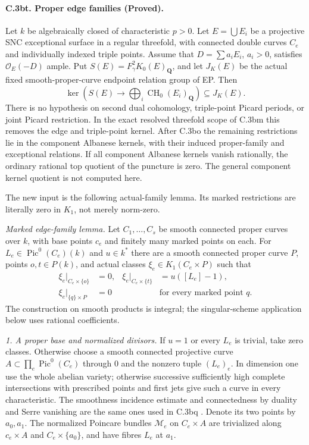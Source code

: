\paragraph{C.3bt. Proper edge families (Proved).}
Let $k$ be algebraically closed of characteristic $p>0$.
Let $E=\bigcup E_i$ be a projective SNC exceptional surface in a
regular threefold, with connected double curves $C_e$ and individually
indexed triple points. Assume that $D=\sum a_iE_i$, $a_i>0$, satisfies
$\mathcal O_E(-D)$ ample. Put $S(E)=F_\gamma^2K_0(E)_{\mathbf Q}$,
and let $J_K(E)$ be the actual fixed smooth-proper-curve endpoint
relation group of EP. Then
\begin{equation}
 \ker\left(S(E)\longrightarrow
       \bigoplus_i\operatorname{CH}_0(E_i)_{\mathbf Q}\right)
                       \subseteq J_K(E).                 \tag{VE.1}
\end{equation}
There is no hypothesis on second dual cohomology, triple-point
Picard periods, or joint Picard restriction. In the exact resolved
threefold scope of C.3bm this removes the edge and triple-point kernel.
After C.3bo the remaining restrictions lie in the component Albanese
kernels, with their induced proper-family and exceptional relations.
If all component Albanese kernels vanish rationally, the ordinary
rational top quotient of the puncture is zero. The general component
kernel quotient is not computed here.

The new input is the following actual-family lemma. Its marked
restrictions are literally zero in $K_1$, not merely norm-zero.

\emph{Marked edge-family lemma.}
Let $C_1,\ldots,C_s$ be smooth connected proper curves over $k$,
with base points $c_e$ and finitely many marked points on each.
For $L_e\in\operatorname{Pic}^0(C_e)(k)$ and $u\in k^*$ there are
a smooth connected proper curve $P$, points $o,t\in P(k)$, and
actual classes $\xi_e\in K_1(C_e\times P)$ such that
\begin{align}
 \xi_e|_{C_e\times\{o\}}&=0,&
 \xi_e|_{C_e\times\{t\}}&=u([L_e]-1),\nonumber\\
 \xi_e|_{\{q\}\times P}&=0
 &&\text{for every marked point }q.                       \tag{VE.2}
\end{align}
The construction on smooth products is integral; the singular-scheme
application below uses rational coefficients.

\emph{1. A proper base and normalized divisors.}
If $u=1$ or every $L_e$ is trivial, take zero classes. Otherwise choose
a smooth connected projective curve
$A\subset\prod_e\operatorname{Pic}^0(C_e)$ through $0$ and the
nonzero tuple $(L_e)_e$. In dimension one use the whole abelian
variety; otherwise successive sufficiently high complete intersections
with prescribed points and first jets give such a curve in every
characteristic. The smoothness incidence estimate and connectedness
by duality and Serre vanishing are the same ones used in C.3bq
\citep[Lemma 33.47.3 and proof]{D_StacksBertiniUniformHigher}.
Denote its two points by $a_0,a_1$. The normalized Poincare bundles
$\mathcal M_e$ on $C_e\times A$ are trivialized along $c_e\times A$
and $C_e\times\{a_0\}$, and have fibres $L_e$ at $a_1$.

